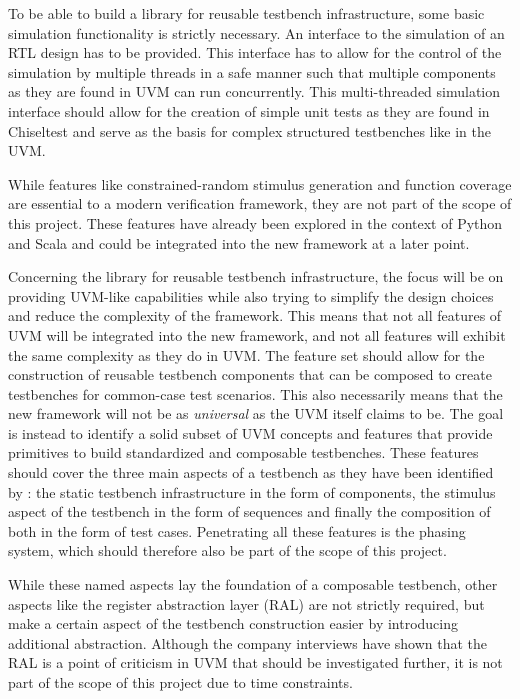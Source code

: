 To be able to build a library for reusable testbench infrastructure, some basic simulation functionality is strictly necessary. An interface to the simulation of an RTL design has to be provided. This interface has to allow for the control of the simulation by multiple threads in a safe manner such that multiple components as they are found in UVM can run concurrently. This multi-threaded simulation interface should allow for the creation of simple unit tests as they are found in Chiseltest and serve as the basis for complex structured testbenches like in the UVM.

While features like constrained-random stimulus generation and function coverage are essential to a modern verification framework, they are not part of the scope of this project. These features have already been explored in the context of Python and Scala and could be integrated into the new framework at a later point. 

Concerning the library for reusable testbench infrastructure, the focus will be on providing UVM-like capabilities while also trying to simplify the design choices and reduce the complexity of the framework. This means that not all features of UVM will be integrated into the new framework, and not all features will exhibit the same complexity as they do in UVM. The feature set should allow for the construction of reusable testbench components that can be composed to create testbenches for common-case test scenarios. This also necessarily means that the new framework will not be as \textit{universal} as the UVM itself claims to be. The goal is instead to identify a solid subset of UVM concepts and features that provide primitives to build standardized and composable testbenches. These features should cover the three main aspects of a testbench as they have been identified by \citeauthor{sutherland2015uvm} \cite{sutherland2015uvm}: the static testbench infrastructure in the form of components, the stimulus aspect of the testbench in the form of sequences and finally the composition of both in the form of test cases. Penetrating all these features is the phasing system, which should therefore also be part of the scope of this project.

While these named aspects lay the foundation of a composable testbench, other aspects like the register abstraction layer (RAL) are not strictly required, but make a certain aspect of the testbench construction easier by introducing additional abstraction. Although the company interviews have shown that the RAL is a point of criticism in UVM that should be investigated further, it is not part of the scope of this project due to time constraints.

